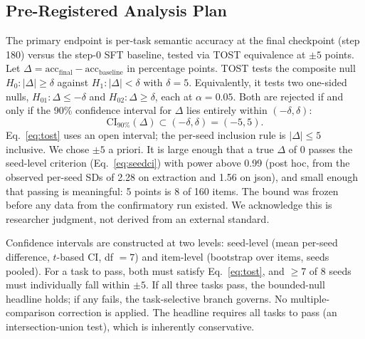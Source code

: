 \documentclass{article}
\begin{document}
\subsection{Pre-Registered Analysis Plan}
The primary endpoint is per-task semantic accuracy at the final checkpoint (step 180) versus the step-0 SFT baseline, tested via TOST equivalence at $\pm5$ points. Let $\Delta = \text{acc}_{\text{final}} - \text{acc}_{\text{baseline}}$ in percentage points. TOST tests the composite null $H_0: |\Delta| \geq \delta$ against $H_1: |\Delta| < \delta$ with $\delta = 5$. Equivalently, it tests two one-sided nulls, $H_{01}: \Delta \leq -\delta$ and $H_{02}: \Delta \geq \delta$, each at $\alpha = 0.05$. Both are rejected if and only if the 90\% confidence interval for $\Delta$ lies entirely within $(-\delta, \delta)$:
\begin{equation}
\text{CI}_{90\%}(\Delta) \subset (-\delta, \delta) = (-5, 5).
\label{eq:tost}
\end{equation}
Eq.~\eqref{eq:tost} uses an open interval; the per-seed inclusion rule is $|\Delta| \leq 5$ inclusive. We chose $\pm5$ a priori. It is large enough that a true $\Delta$ of 0 passes the seed-level criterion (Eq.~\eqref{eq:seedci}) with power above 0.99 (post hoc, from the observed per-seed SDs of 2.28 on extraction and 1.56 on json), and small enough that passing is meaningful: 5 points is 8 of 160 items. The bound was frozen before any data from the confirmatory run existed. We acknowledge this is researcher judgment, not derived from an external standard.

Confidence intervals are constructed at two levels: seed-level (mean per-seed difference, $t$-based CI, df $= 7$) and item-level (bootstrap over items, seeds pooled). For a task to pass, both must satisfy Eq.~\eqref{eq:tost}, and $\ge$7 of 8 seeds must individually fall within $\pm5$. If all three tasks pass, the bounded-null headline holds; if any fails, the task-selective branch governs. No multiple-comparison correction is applied. The headline requires all tasks to pass (an intersection-union test), which is inherently conservative.
\end{document}
